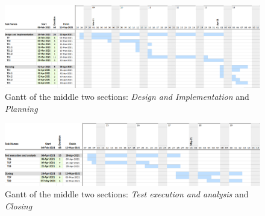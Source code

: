 \begin{landscape}

\begin{figure}[ht]
        \centering
        \includegraphics[scale=0.27]{Figures/Gantt_SI_and_P.png}
        \caption{Gantt of the middle two sections: \textit{Design and Implementation} and \textit{Planning}}
        \label{fig:GanttSIP}
\end{figure}

\begin{figure}[ht]
        \centering
        \includegraphics[scale=0.29]{Figures/Gantt_TA_and_C.png}
        \caption{Gantt of the middle two sections: \textit{Test execution and analysis} and \textit{Closing}}
        \label{fig:GanttTAC}
\end{figure}

\end{landscape}